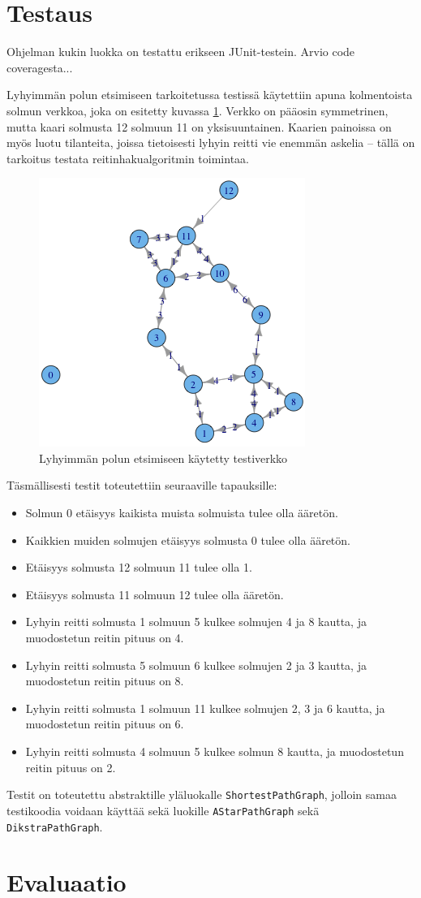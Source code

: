 \documentclass[10pt,a4paper]{article}
\begin{document}
\section{Testaus}
\label{test}

Ohjelman kukin luokka on testattu erikseen JUnit-testein. Arvio code coveragesta...

Lyhyimmän polun etsimiseen tarkoitetussa testissä käytettiin apuna kolmentoista solmun verkkoa, joka on esitetty kuvassa \ref{testiverkko}. Verkko on pääosin symmetrinen, mutta kaari solmusta 12 solmuun 11 on yksisuuntainen. Kaarien painoissa on myös luotu tilanteita, joissa tietoisesti lyhyin reitti vie enemmän askelia -- tällä on tarkoitus testata reitinhakualgoritmin toimintaa.

\begin{figure}
\includegraphics[scale=.5]{test_network.png} 
\caption{Lyhyimmän polun etsimiseen käytetty testiverkko}
\label{testiverkko}
\end{figure}

Täsmällisesti testit toteutettiin seuraaville tapauksille:

\begin{itemize}
\item Solmun 0 etäisyys kaikista muista solmuista tulee olla ääretön.
\item Kaikkien muiden solmujen etäisyys solmusta 0 tulee olla ääretön.
\item Etäisyys solmusta 12 solmuun 11 tulee olla 1.
\item Etäisyys solmusta 11 solmuun 12 tulee olla ääretön.
\item Lyhyin reitti solmusta 1 solmuun 5 kulkee solmujen 4 ja 8 kautta, ja muodostetun reitin pituus on 4.
\item Lyhyin reitti solmusta 5 solmuun 6 kulkee solmujen 2 ja 3 kautta, ja muodostetun reitin pituus on 8.
\item Lyhyin reitti solmusta 1 solmuun 11 kulkee solmujen 2, 3 ja 6 kautta, ja muodostetun reitin pituus on 6.
\item Lyhyin reitti solmusta 4 solmuun 5 kulkee solmun 8 kautta, ja muodostetun reitin pituus on 2.
\end{itemize}

Testit on toteutettu abstraktille yläluokalle \texttt{ShortestPathGraph}, jolloin samaa testikoodia voidaan käyttää sekä luokille \texttt{AStarPathGraph} sekä \texttt{DikstraPathGraph}.

\section{Evaluaatio}

 

\end{document}
